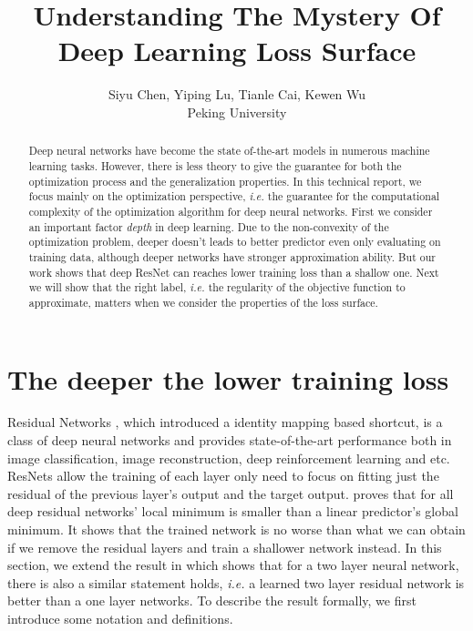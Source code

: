 \documentclass{article}
\title{Understanding The Mystery Of Deep Learning Loss Surface}
\author{
	Siyu Chen, Yiping Lu, Tianle Cai, Kewen Wu\\
Peking University
}
\theoremstyle{plain}
\theoremstyle{definition}
\begin{document}

\maketitle

\begin{abstract}
Deep neural networks have become the state of-the-art
models in numerous machine learning
tasks. However, there is less theory to give the guarantee for both the optimization process and the generalization properties. In this technical report, we focus mainly on the optimization perspective, \emph{i.e.} the guarantee for the computational complexity of the optimization algorithm for deep neural networks. First we consider an important factor \emph{depth} in deep learning. Due to the non-convexity of the optimization problem, deeper doesn't leads to better predictor even only evaluating on training data, although deeper networks have stronger approximation ability. But our work shows that deep ResNet can reaches lower training loss than a shallow one. Next we will show that the right label, \emph{i.e.} the regularity of the objective function to approximate, matters when we consider the properties of the loss surface. 
\end{abstract}

\section{The deeper the lower training loss}

Residual Networks \cite{he2016deep,he2016identity}, which introduced a identity mapping based shortcut, is a class of deep neural networks and provides state-of-the-art performance both in image classification\cite{he2016deep,he2016identity}, image reconstruction\cite{he2016deep}, deep reinforcement learning\cite{silver2017mastering} and etc. ResNets allow the training of each layer only need to focus on fitting just the residual of the previous layer’s output and the target output. \cite{2018arXiv180406739S} proves that for all deep residual networks' local minimum is smaller than a linear predictor's global minimum. It shows that the trained network is no worse than what we can obtain if we remove the
residual layers and train a shallower network instead. In this section, we extend the result in \cite{2018arXiv180406739S} which shows that for a two layer neural network, there is also a similar statement holds, \emph{i.e.} a learned two layer residual network is better than a one layer networks. To describe the result formally, we first introduce some notation and definitions. 
\end{document}
